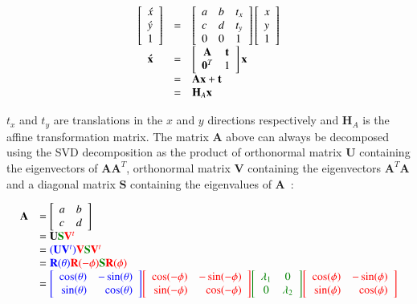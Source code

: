 \begin{equation}
\begin{array}{cllll}
\left[\begin{array}{l}\acute{x}\\\acute{y}\\1\end{array}\right]   &=& \left[ \begin{array}{lll} a &b & t_x \\ c & d & t_y \\ 0 & 0 & 1 \\ \end{array} \right] \left[\begin{array}{l}x\\y\\1\end{array}\right]\\
\mathbf{\acute{x}} &=& \left[\begin{array}{cccc}\mathbf{A} & \mathbf{t}\\\mathbf{0}^T & 1\end{array}\right] \mathbf{x}\\
&=& \mathbf{A}\mathbf{x} + \mathbf{t}\\
&=& \mathbf{H}_A \mathbf{x}\\
\end{array}
\label{Eqn:top_level}
\end{equation}

$t_x$ and $t_y$ are translations in the $x$ and $y$ directions respectively and $\mathbf{H}_A$ is the affine transformation matrix.  The matrix $\mathbf{A}$ above can always be decomposed using the SVD decomposition as the product of orthonormal matrix $\mathbf{U}$ containing the eigenvectors of $\mathbf{A}\mathbf{A}^T$, orthonormal matrix $\mathbf{V}$ containing the eigenvectors  $\mathbf{A}^T\mathbf{A}$ and a diagonal matrix $\mathbf{S}$ containing the eigenvalues of $\mathbf{A}$~\cite{2004_BOOK_CG_Hartley}:

\begin{equation}
\begin{array}{llllllll}
\mathbf{A} &= \left[\begin{array}{lll}a & b \\ c & d\\ \end{array}\right] \\
&=\mathbf{U}{\color{darkgreen}\mathbf{S}}{\color{red}\mathbf{V}^t} \\
&={\color{blue}(\mathbf{U}\mathbf{V}^t)}{\color{red}\mathbf{V}}{\color{darkgreen}\mathbf{S}}{\color{red}\mathbf{V}^t}\\
&={\color{blue}\mathbf{R}(\theta)}{\color{red}\mathbf{R}(-\phi)}{\color{darkgreen}\mathbf{S}}{\color{red}\mathbf{R} (\phi)}\\
&={\color{blue}\RotMatrixTheta}{\color{red}\RotMatrixminusPhi}{\color{darkgreen}\EigenvalueMatrix}{\color{red}\RotMatrixPhi}\\\\
\end{array}
\label{Eq:AffineDecomposition}
\end{equation}

